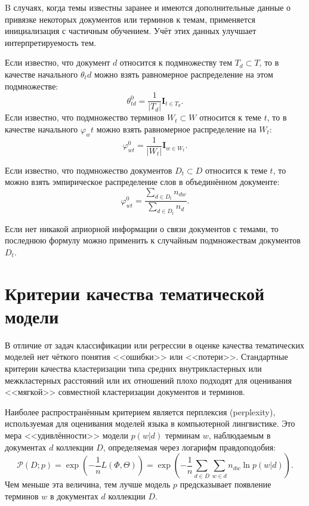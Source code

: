 \documentclass[article, 10pt]{disser}
\begin{document}
B случаях, когда темы известны заранее и имеются дополнительные данные о привязке некоторых документов или терминов к темам, применяется инициализация с частичным обучением. Учёт этих данных улучшает интерпретируемость тем.

Если известно, что документ $d$ относится к подмножеству тем $T_d \subset T$, то в качестве начального  $\theta_td$ можно взять равномерное распределение на этом подмножестве:
\begin{equation*}
    \theta_{td}^{0} = \frac{1}{|T_d|}\mathbf{I}_{t \in T_d}.
\end{equation*}
Если известно, что подмножество терминов $W_t \subset W$ относится к теме $t$, то в качестве начального $\varphi_wt$ можно взять равномерное распределение на $W_t$:
\begin{equation*}
   \varphi_{wt}^{0} = \frac{1}{|W_t|}\mathbf{I}_{w \in W_t}.
\end{equation*}

Если известно, что подмножество документов $D_t \subset D$ относится к теме $t$, то можно взять эмпирическое распределение слов в объединённом документе:
\begin{equation*}
   \varphi_{wt}^{0} = \frac{\sum_{d \in D_t}n_{dw}}{\sum_{d \in D_t}n_{d}}.
\end{equation*}

Если нет никакой априорной информации о связи документов с темами, то последнюю формулу можно применить к случайным подмножествам документов $D_t$.

\section{Критерии качества тематической модели}
В отличие от задач классификации или регрессии в оценке качества тематических моделей нет чёткого понятия <<ошибки>> или <<потери>>. Стандартные критерии качества кластеризации типа средних внутрикластерных или межкластерных расстояний или их отношений плохо подходят для оценивания <<мягкой>> совместной кластеризации документов и терминов.

Наиболее распространённым критерием является перплексия (perplexity), используемая для оценивания моделей языка в компьютерной лингвистике. Это мера
<<удивлённости>> модели $p(w | d)$ терминам $w$, наблюдаемым в документах $d$ коллекции $D$, определяемая через логарифм правдоподобия:
\begin{equation*}
    \mathcal{P}(D; p) = \exp\left(-\frac{1}{n}L(\Phi, \Theta)\right)= \exp \left( -\frac{1}{n}\sum\limits_{d \in D}\sum\limits_{w \in d}n_{dw}\ln p(w|d)\right).
\end{equation*}
Чем меньше эта величина, тем лучше модель $p$ предсказывает появление терминов $w$ в документах $d$ коллекции $D$.
\end{document}
